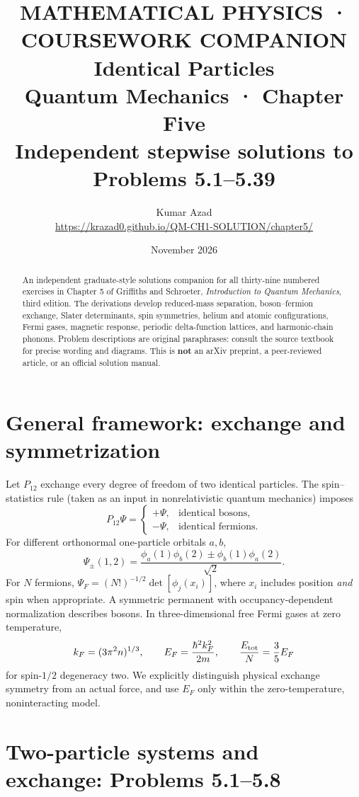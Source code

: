 \documentclass[11pt,a4paper]{article}
\title{\textcolor{accent}{\large MATHEMATICAL PHYSICS · COURSEWORK COMPANION}\\[9pt]
\Huge\textbf{Identical Particles}\\[12pt]
\Large Quantum Mechanics · Chapter Five\\[5pt]
\normalsize Independent stepwise solutions to Problems 5.1–5.39}
\author{Kumar Azad\\\small\url{https://krazad0.github.io/QM-CH1-SOLUTION/chapter5/}}
\date{November 2026}
\numberwithin{equation}{section}
\newcommand{\sh}{\hbar}
\begin{document}
\maketitle
\begin{abstract}
An independent graduate-style solutions companion for all thirty-nine numbered
exercises in Chapter 5 of Griffiths and Schroeter,
\emph{Introduction to Quantum Mechanics}, third edition.
The derivations develop reduced-mass separation, boson--fermion exchange,
Slater determinants, spin symmetries, helium and atomic configurations,
Fermi gases, magnetic response, periodic delta-function lattices,
and harmonic-chain phonons. Problem descriptions are original paraphrases:
consult the source textbook for precise wording and diagrams.
This is \textbf{not} an arXiv preprint, a peer-reviewed article,
or an official solution manual.
\end{abstract}
\tableofcontents
\section{General framework: exchange and symmetrization}
Let $P_{12}$ exchange every degree of freedom of two identical particles.
The spin--statistics rule (taken as an input in nonrelativistic quantum mechanics)
imposes
\begin{equation}
P_{12}\Psi=\begin{cases}+\Psi,&\text{identical bosons},\\
-\Psi,&\text{identical fermions}.\end{cases}
\end{equation}
For different orthonormal one-particle orbitals $a,b$,
\begin{equation}
\Psi_\pm(1,2)=\frac{\phi_a(1)\phi_b(2)\pm
\phi_b(1)\phi_a(2)}{\sqrt2}.
\end{equation}
For $N$ fermions, $\Psi_F=(N!)^{-1/2}\det[\phi_j(x_i)]$,
where $x_i$ includes position \emph{and} spin when appropriate.
A symmetric permanent with occupancy-dependent normalization describes
bosons. In three-dimensional free Fermi gases at zero temperature,
\begin{equation}
k_F=(3\pi^2n)^{1/3},\qquad
E_F=\frac{\sh^2k_F^2}{2m},\qquad
\frac{E_{\rm tot}}{N}=\frac35E_F
\end{equation}
for spin-$1/2$ degeneracy two.
We explicitly distinguish physical exchange symmetry from an actual force,
and use $E_F$ only within the zero-temperature, noninteracting model.

\section{Two-particle systems and exchange: Problems 5.1--5.8}

\end{document}
